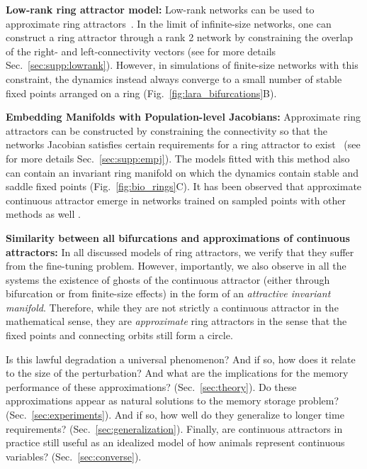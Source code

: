 \documentclass{article} %
\newcommand{\ptitle}[1]{\textbf{#1:}\xspace}
\newcounter{ct}
\theoremstyle{definition}
\theoremstyle{remark}
\begin{document}
\ptitle{Low-rank ring attractor model} %
Low-rank networks can be used to approximate ring attractors~\citep{mastrogiuseppe2018, beiran2021}.
In the limit of infinite-size networks, one can construct a ring attractor through a rank 2 network by constraining the overlap of the right- and left-connectivity vectors (see for more details  Sec.~\ref{sec:supp:lowrank}).
However, in simulations of finite-size networks with this constraint, the dynamics instead always converge to a small number of stable fixed points arranged on a ring (Fig.~\ref{fig:lara_bifurcations}B).

\ptitle{Embedding Manifolds with Population-level Jacobians} %
Approximate ring attractors can be constructed by constraining the connectivity so that the networks Jacobian satisfies certain requirements for a ring attractor to exist~\citep{pollock2020} (see for more details Sec.~\ref{sec:supp:empj}).
The models fitted with this method also can contain an invariant ring manifold on which the dynamics contain stable and saddle fixed points (Fig.~\ref{fig:bio_rings}C).
It has been observed that approximate continuous attractor emerge in networks trained on sampled points with other methods as well \citep{darshan2022}.

\ptitle{Similarity between all bifurcations and approximations of continuous attractors}
In all discussed models of ring attractors, we verify that they suffer from the fine-tuning problem.
However, importantly, we also observe in all the systems  the existence of ghosts of the continuous attractor (either through bifurcation or from finite-size effects) in the form of an \emph{attractive invariant manifold}.
Therefore, while they are not strictly a continuous attractor in the mathematical sense, they are \textit{approximate} ring attractors in the sense that the fixed points and connecting orbits still form a circle.

Is this lawful degradation a universal phenomenon?
 And if so, how does it relate to the size of the perturbation? And what are the implications for the memory performance of these approximations? (Sec.~\ref{sec:theory}).
Do these approximations appear as natural solutions to the memory storage problem? (Sec.~\ref{sec:experiments}).
 And if so, how well do they generalize to longer time requirements? (Sec.~\ref{sec:generalization}).
 Finally, are continuous attractors in practice still useful as an idealized model of how animals represent continuous variables? (Sec.~\ref{sec:converse}).
\end{document}
